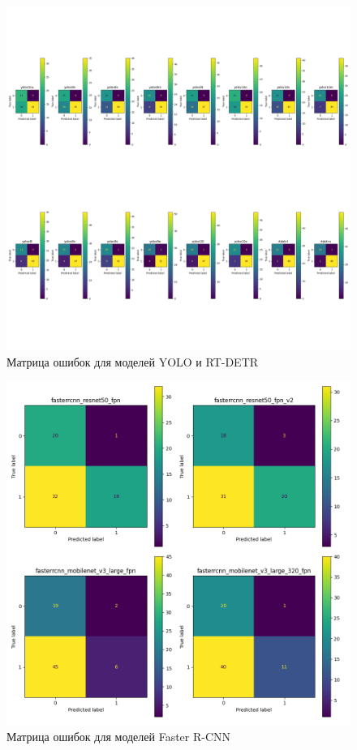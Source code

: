 \documentclass[../document.tex]{subfiles}
\begin{document}
 		\begin{figure}[H]
 			\centering
 			\includegraphics[scale=0.35]{ConfMat_plot.png}
 			\caption{Матрица ошибок для моделей YOLO и RT-DETR}
 		\end{figure}
 		\begin{figure}[H]
 			\centering
 			\includegraphics[scale=0.4]{RCNN_ConfMat.png}
 			\caption{Матрица ошибок для моделей Faster R-CNN}
 		\end{figure}
\end{document}
